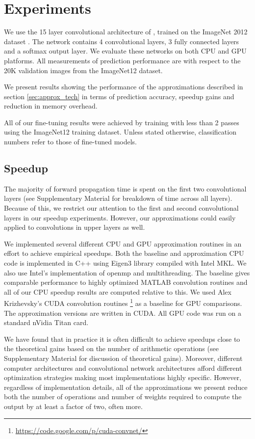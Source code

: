 \section{Experiments}\label{sec:experiments}

We use the 15 layer convolutional architecture of \cite{zeiler2013visualizing}, trained on the
ImageNet 2012 dataset \cite{imagenet}.
The network contains 4 convolutional layers, 3 fully connected layers and a softmax output layer.
We evaluate these networks on both CPU and GPU platforms. All measurements of prediction performance are with respect to the 20K validation images from the ImageNet12 dataset. 

We present results showing the performance of the approximations described in section \ref{sec:approx_tech} in terms of prediction accuracy, speedup gains and reduction in memory overhead. 

All of our fine-tuning results were achieved by training with less than 2 passes using the ImageNet12 training dataset. 
Unless stated otherwise, classification numbers refer to those of fine-tuned models.
 
\subsection{Speedup}
The majority of forward propagation time is spent on the first two convolutional layers (see Supplementary Material for breakdown of time across all layers).
Because of this, we restrict our attention to the first and second convolutional layers in our speedup experiments. 
However, our approximations could easily
applied to convolutions in upper layers as well.

We implemented several different CPU and GPU approximation routines 
in an effort to achieve empirical
speedups. Both the baseline and approximation CPU code is implemented
in C++ using Eigen3 library \cite{eigenweb} compiled with Intel MKL.
We also use Intel's implementation of openmp and multithreading. The
baseline gives comparable performance to highly optimized MATLAB
convolution routines and all of our CPU speedup results are computed
relative to this.  We used Alex Krizhevsky's CUDA convolution routines
\footnote{\url{https://code.google.com/p/cuda-convnet/}} as a baseline for GPU
comparisons. The approximation versions are written in CUDA. All GPU
code was run on a standard nVidia Titan card.

We have found that in practice it is often difficult to achieve
speedups close to the theoretical gains based on the number of
arithmetic operations (see Supplementary Material for discussion of theoretical gains).
Moreover, different computer architectures and convolutional network
architectures afford different optimization strategies making most
implementations highly specific.  However, regardless of
implementation details, all of the approximations we present reduce
both the number of operations and number of weights required to
compute the output by at least a factor of two, often more.  

